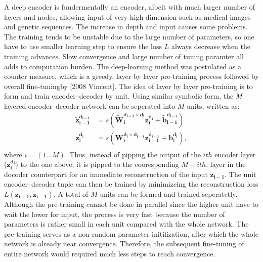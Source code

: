 A deep encoder is fundermentally an encoder, albeit with much larger number of layers and nodes, allowing input of very high dimension such as medical images and genetic sequences. The increase in depth and input causes some problems. The training tends to be unstable due to the large number of parameters, so one have to use smaller learning step to ensure the loss $L$ always decrease when the training advances. Slow convergence and large number of tuning paramter all adds to computation burden. The deep-learning method was postulated as a counter measure, which is a greedy, layer by layer pre-training process followed by overall fine-tuningby [2008 Vincent]. The idea of layer by layer pre-training is to form and train encoder--decoder by unit. Using similar symbolic form, the $M \time 2$ layered encoder--decoder network can be seperated into $M$ units, written as:
\begin{equation} \label{eq:unit encoder-decoder}
\begin{split}
  \boldsymbol{\tilde{z}_{i-1}^{d_{i-1}}} &= s(\boldsymbol{\tilde{W}_{i  }^{d_{i-1} \times d_{i  }} z_{i  }^{d_{i  }}}+\boldsymbol{\tilde{b}_{i-1}^{d_{i-1}}}) \\
  \boldsymbol{z_{i  }^{d_{i  }}}         &= s(\boldsymbol{W_{i  }^{d_{i  } \times d_{i-1}} z_{i-1}^{d_{i-1}}}+\boldsymbol{b_{i  }^{d_{i  }}}), \\
\end{split}
\end{equation}
where $i=(1 \ldots M)$. Thus, instead of pipping the output of the $i th$ encoder layer ($\boldsymbol{z_{i  }^{d_{i  }}}$) to the one above, it is pipped to the cooresponding $M-i th.$ layer in the docoder counterpart for an immediate reconstruction of the input $\boldsymbol{z_{i-1}}$. The unit encoder--decoder tuple can then be trained by minimizeing the reconstruction loss $L(\boldsymbol{z_{i-1}},\boldsymbol{\tilde{z}_{i-1}})$. A total of $M$ units can be formed and trained seperatetly. Although the pre-training cannot be done in parallel since the higher unit have to wait the lower for input, the process is very fast because the number of parameters is rather small in each unit compared with the whole network. The pre-training serves as a non-random parameter initilization, after which the whole network is already near convergence. Therefore, the subsequent fine-tuning of entire network would required much less steps to reach convergence.

